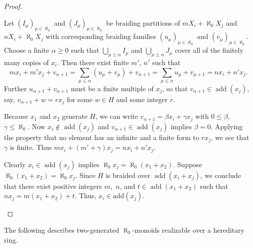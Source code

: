 \documentclass[a4paper,11pt,oneside]{amsart}
\theoremstyle{remark}
\DeclareMathOperator{\add}{add}
\begin{document}
\begin{proof}
\begin{proofenumerate}
  \item[\ref{efl1:add-incomparable}]
  Let $(I_\mu)_{\mu \in \aleph_0}$ and $(J_\mu)_{\mu \in \aleph_0}$ be braiding partitions of $m X_i + \aleph_0 X_j$ and $n X_i + \aleph_0 X_j$ with corresponding braiding families $(u_\mu)_{\mu \in \aleph_0}$ and $(v_\mu)_{\mu \in \aleph_0}$.
  Choose a finite $\alpha \ge 0$ such that $\bigcup_{\mu \le \alpha} I_\mu$ and $\bigcup_{\mu \le \alpha} J_\mu$ cover all of the finitely many copies of $x_i$.
  Then there exist finite $m'$, $n'$ such that
  \[
    m x_i + m' x_j + v_{\alpha+1} = \sum_{\mu \le \alpha} (u_\mu + v_\mu) + v_{\alpha + 1} = \sum_{\mu \le \alpha} u_{\mu} + v_{\mu + 1} = n x_i + n' x_j.
  \]
  Further $u_{\alpha+1} + v_{\alpha +1}$ must be a finite multiple of $x_j$, so that $v_{\alpha + 1} \in \add(x_j)$, say, $v_{\alpha+1} + w = rx_j$ for some $w \in H$ and some integer $r$.

  Because $x_1$ and $x_2$ generate $H$, we can write $v_{\alpha+1} = \beta x_i + \gamma x_j$ with $0 \le \beta$,~$\gamma \le \aleph_0$.
  Now $x_i \not \in \add(x_j)$ and $v_{\alpha+1} \in \add(x_j)$ implies $\beta = 0$.
  Applying the property that no element has an infinite and a finite form to $rx_j$, we see that $\gamma$ is finite.
  Thus $m x_i + (m'+\gamma) x_j = n x_i + n'x_j$.

  \item[\ref{efl1:add-inclusion-iff}]
  Clearly $x_i \in \add(x_j)$ implies $\aleph_0 x_j = \aleph_0(x_1 + x_2)$.
  Suppose $\aleph_0 (x_1 + x_2) = \aleph_0 x_j$.
  Since $H$ is braided over $\add(x_i + x_j)$, we conclude that there exist positive integers $m$,~$n$, and $t \in \add(x_1+x_2)$ such that $n x_j = m (x_1 +  x_2) + t$.
  Thus, $x_i \in \text{add}(x_j)$. \qedhere
  \end{proofenumerate}
\end{proof}

The following describes two-generated $\aleph_0$-monoids realizable over a hereditary ring.
\end{document}
